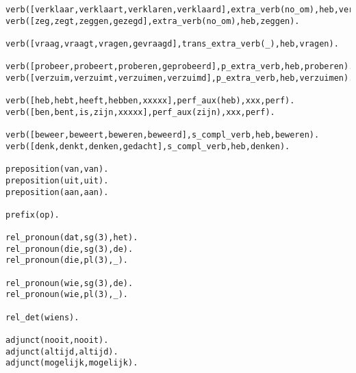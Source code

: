 \begin{verbatim}
verb([verklaar,verklaart,verklaren,verklaard],extra_verb(no_om),heb,verklaren).
verb([zeg,zegt,zeggen,gezegd],extra_verb(no_om),heb,zeggen).

verb([vraag,vraagt,vragen,gevraagd],trans_extra_verb(_),heb,vragen).

verb([probeer,probeert,proberen,geprobeerd],p_extra_verb,heb,proberen).
verb([verzuim,verzuimt,verzuimen,verzuimd],p_extra_verb,heb,verzuimen).

verb([heb,hebt,heeft,hebben,xxxxx],perf_aux(heb),xxx,perf).
verb([ben,bent,is,zijn,xxxxx],perf_aux(zijn),xxx,perf).

verb([beweer,beweert,beweren,beweerd],s_compl_verb,heb,beweren).
verb([denk,denkt,denken,gedacht],s_compl_verb,heb,denken).

preposition(van,van).
preposition(uit,uit).
preposition(aan,aan).

prefix(op).

rel_pronoun(dat,sg(3),het).             
rel_pronoun(die,sg(3),de).
rel_pronoun(die,pl(3),_).

rel_pronoun(wie,sg(3),de).
rel_pronoun(wie,pl(3),_).

rel_det(wiens).

adjunct(nooit,nooit).
adjunct(altijd,altijd).
adjunct(mogelijk,mogelijk).
\end{verbatim}
